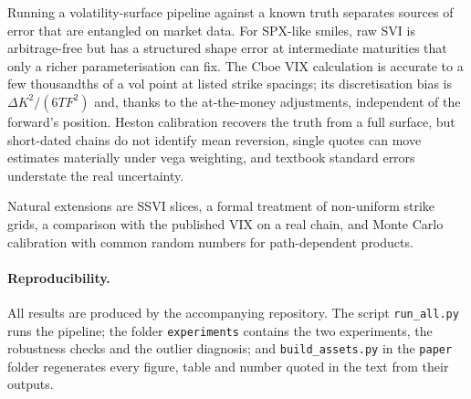 \documentclass[11pt]{article}
\theoremstyle{remark}
\newcommand{\dK}{\Delta K}
\begin{document}
Running a volatility-surface pipeline against a known truth separates sources of error that are entangled on market data.
For SPX-like smiles, raw SVI is arbitrage-free but has a structured shape error at intermediate maturities that only a richer parameterisation can fix.
The Cboe VIX calculation is accurate to a few thousandths of a vol point at listed strike spacings; its discretisation bias is $\dK^2/(6TF^2)$ and, thanks to the at-the-money adjustments, independent of the forward's position.
Heston calibration recovers the truth from a full surface, but short-dated chains do not identify mean reversion, single quotes can move estimates materially under vega weighting, and textbook standard errors understate the real uncertainty.

Natural extensions are SSVI slices, a formal treatment of non-uniform strike grids, a comparison with the published VIX on a real chain, and Monte Carlo calibration with common random numbers for path-dependent products.

\paragraph{Reproducibility.}
All results are produced by the accompanying repository.
The script \texttt{run\_all.py} runs the pipeline; the folder \texttt{experiments} contains the two experiments, the robustness checks and the outlier diagnosis; and \texttt{build\_assets.py} in the \texttt{paper} folder regenerates every figure, table and number quoted in the text from their outputs.



\end{document}
